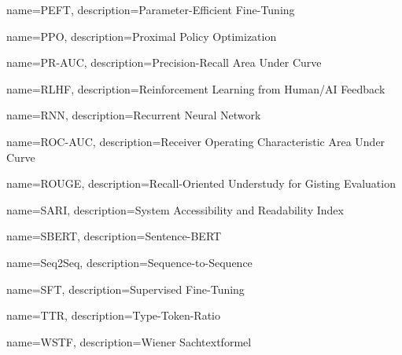 {
    name={PEFT},
    description={Parameter-Efficient Fine-Tuning}
}

{
    name={PPO},
    description={Proximal Policy Optimization}
}

{
    name={PR-AUC},
    description={Precision-Recall Area Under Curve}
}

{
    name={RLHF},
    description={Reinforcement Learning from Human/AI Feedback}
}

{
    name={RNN},
    description={Recurrent Neural Network}
}

{
    name={ROC-AUC},
    description={Receiver Operating Characteristic Area Under Curve}
}

{
    name={ROUGE},
    description={Recall-Oriented Understudy for Gisting Evaluation}
}

{
    name={SARI},
    description={System Accessibility and Readability Index}
}

{
    name={SBERT},
    description={Sentence-BERT}
}

{
    name={Seq2Seq},
    description={Sequence-to-Sequence}
}

{
    name={SFT},
    description={Supervised Fine-Tuning}
}

{
    name={TTR},
    description={Type-Token-Ratio}
}

{
    name={WSTF},
    description={Wiener Sachtextformel}
}

\glsaddall
